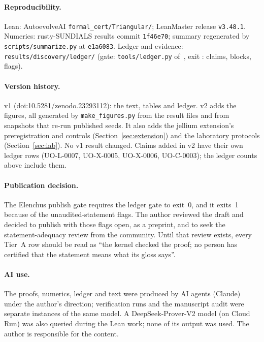 \documentclass[11pt]{article}
\begin{document}
\paragraph{Reproducibility.} Lean: AutoevolveAI \texttt{formal\_cert/Triangular/}; LeanMaster release
\texttt{v3.48.1}. Numerics: rusty-SUNDIALS results commit \texttt{1f46e70}; summary regenerated by \texttt{scripts/summarize.py} at
\texttt{e1a6083}. Ledger and evidence:
\texttt{results/discovery/ledger/} (gate: \texttt{tools/ledger.py} of~\cite{elenchus}, exit \LedgerExit{}:
\LedgerClaims{} claims, \LedgerBlocks{} blocks, \LedgerFlags{} flags).

\paragraph{Version history.} v1 (doi:10.5281/zenodo.23293112): the text, tables and ledger. v2 adds the figures,
all generated by \texttt{make\_figures.py} from the result files and from snapshots that re-run published seeds. It
also adds the jellium extension's preregistration and controls (Section~\ref{sec:extension}) and the laboratory
protocols (Section~\ref{sec:lab}). No v1 result changed. Claims added in v2 have their own ledger rows (UO-L-0007,
UO-X-0005, UO-X-0006, UO-C-0003); the ledger counts above include them.

\paragraph{Publication decision.} The Elenchus publish gate requires the ledger gate to exit~0, and it exits~1
because of the \LedgerFlags{} unaudited-statement flags. The author reviewed the draft and decided to publish with
those flags open, as a preprint, and to seek the statement-adequacy review from the community. Until that review
exists, every Tier~A row should be read as ``the kernel checked the proof; no person has certified that the statement
means what its gloss says''.

\paragraph{AI use.} The proofs, numerics, ledger and text were produced by AI agents (Claude) under the author's
direction; verification runs and the manuscript audit were separate instances of the same model. A DeepSeek-Prover-V2
model (on Cloud Run) was also queried during the Lean work; none of its output was used. The author is responsible
for the content.
\end{document}

